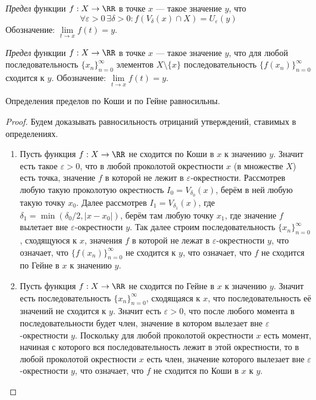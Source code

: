 \documentclass[12pt,a4paper]{article}
\begin{document}
    \begin{definition}[по Коши]
        \emph{Предел} функции $f: X \to \RR$ в точке $x$ --- такое значение $y$, что
        \[\forall \varepsilon > 0\, \exists \delta > 0: f(V_\delta(x) \cap X) = U_\varepsilon(y)\]
        Обозначение: $\lim\limits_{t \to x} f(t) = y$.
    \end{definition}

    \begin{definition}[по Гейне]
        \emph{Предел} функции $f: X \to \RR$ в точке $x$ --- такое значение $y$, что для любой последовательность $\{x_n\}_{n=0}^\infty$ элементов $X \setminus \{x\}$ последовательность $\{f(x_n)\}_{n=0}^\infty$ сходится к $y$. Обозначение: $\lim\limits_{t \to x} f(t) = y$.
    \end{definition}

    \begin{theorem}
        Определения пределов по Коши и по Гейне равносильны.
    \end{theorem}

    \begin{proof}
        Будем доказывать равносильность отрицаний утверждений, ставимых в определениях.
        \begin{enumerate}
            \item Пусть функция $f: X \to \RR$ не сходится по Коши в $x$ к значению $y$. Значит есть такое $\varepsilon > 0$, что в любой проколотой окрестности $x$ (в множестве $X$) есть точка, значение $f$ в которой не лежит в $\varepsilon$-окрестности. Рассмотрев любую такую проколотую окрестность $I_0 = V_{\delta_0}(x)$, берём в ней любую такую точку $x_0$. Далее рассмотрев $I_1 = V_{\delta_1}(x)$, где $\delta_1 = \min(\delta_0/2, |x-x_0|)$, берём там любую точку $x_1$, где значение $f$ вылетает вне $\varepsilon$-окрестности $y$. Так далее строим последовательность $\{x_n\}_{n=0}^\infty$, сходящуюся к $x$, значения $f$ в которой не лежат в $\varepsilon$-окрестности $y$, что означает, что $\{f(x_n)\}_{n=0}^\infty$ не сходится к $y$, что означает, что $f$ не сходится по Гейне в $x$ к значению $y$.
            \item Пусть функция $f: X \to \RR$ не сходится по Гейне в $x$ к значению $y$. Значит есть последовательность $\{x_n\}_{n=0}^\infty$, сходящаяся к $x$, что последовательность её значений не сходится к $y$. Значит есть $\varepsilon > 0$, что после любого момента в последовательности будет член, значение в котором вылезает вне $\varepsilon$-окрестности $y$. Поскольку для любой проколотой окрестности $x$ есть момент, начиная с которого вся последовательность лежит в этой окрестности, то в любой проколотой окрестности $x$ есть член, значение которого вылезает вне $\varepsilon$-окрестности $y$, что означает, что $f$ не сходится по Коши в $x$ к $y$.
        \end{enumerate}
    \end{proof}
\end{document}
